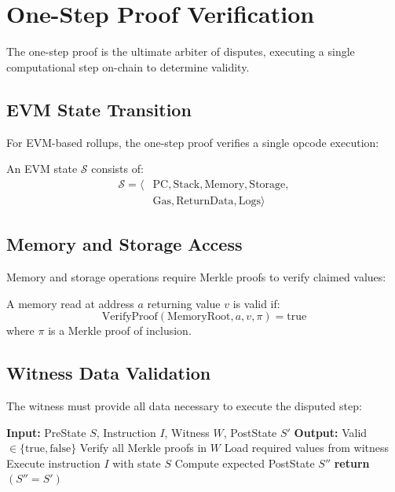 \section{One-Step Proof Verification}


The one-step proof is the ultimate arbiter of disputes, executing a single computational step on-chain to determine validity.

\subsection{EVM State Transition}

For EVM-based rollups, the one-step proof verifies a single opcode execution:

\begin{definition}
An EVM state $\mathcal{S}$ consists of:
\begin{align}
\mathcal{S} = \langle &\text{PC}, \text{Stack}, \text{Memory}, \text{Storage}, \\
&\text{Gas}, \text{ReturnData}, \text{Logs} \rangle
\end{align}
\end{definition}

\subsection{Memory and Storage Access}

Memory and storage operations require Merkle proofs to verify claimed values:

\begin{theorem}
A memory read at address $a$ returning value $v$ is valid if:
\begin{equation}
\text{VerifyProof}(\text{MemoryRoot}, a, v, \pi) = \text{true}
\end{equation}
where $\pi$ is a Merkle proof of inclusion.
\end{theorem}

\subsection{Witness Data Validation}

The witness must provide all data necessary to execute the disputed step:

\begin{algorithm}
\caption{One-Step Verification}
\begin{algorithmic}[1]
\State \textbf{Input:} PreState $S$, Instruction $I$, Witness $W$, PostState $S'$
\State \textbf{Output:} Valid $\in \{\text{true}, \text{false}\}$
\State Verify all Merkle proofs in $W$
\State Load required values from witness
\State Execute instruction $I$ with state $S$
\State Compute expected PostState $S''$
\State \textbf{return} $(S'' = S')$
\end{algorithmic}
\end{algorithm}

